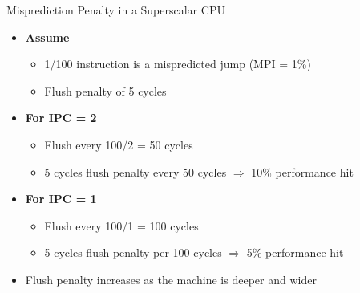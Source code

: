 \documentclass[aspectratio=169,12pt]{beamer}
\begin{document}
\begin{frame}{Misprediction Penalty in a Superscalar CPU}
  \begin{itemize}
    \item \textbf{Assume}
    \begin{itemize}
      \item 1/100 instruction is a mispredicted jump (MPI = 1\%)
      \item Flush penalty of 5 cycles
    \end{itemize}
    
    \vspace{0.5cm}
    
    \item \textbf{For IPC = 2}
    \begin{itemize}
      \item Flush every 100/2 = 50 cycles
      \item 5 cycles flush penalty every 50 cycles $\Rightarrow$ \alert{10\% performance hit}
    \end{itemize}
    
    \vspace{0.5cm}
    
    \item \textbf{For IPC = 1}
    \begin{itemize}
      \item Flush every 100/1 = 100 cycles
      \item 5 cycles flush penalty per 100 cycles $\Rightarrow$ \alert{5\% performance hit}
    \end{itemize}
    
    \vspace{0.5cm}
    
    \item \alert{Flush penalty increases as the machine is deeper and wider}
  \end{itemize}
\end{frame}
\end{document}
